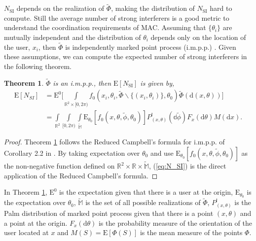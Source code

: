 \documentclass[10pt, conference, letterpaper]{IEEEtran}
\newtheorem{theorem}{Theorem}
\begin{document}
$N_{\mathrm{SI}}$ depends on the realization of $\tilde{\Phi}$, making the distribution of $N_{\mathrm{SI}}$ hard to compute. Still the average number of strong interferers is a good metric to understand the coordination requirements of MAC. Assuming that $\{\theta_i\}$ are mutually independent and the distribution of $\theta_i$ depends only on the location of the user, $x_i$, then $\tilde{\Phi}$ is independently marked point process (i.m.p.p.) \cite{stochasticgeometry}. Given these assumptions, we can compute the expected number of strong interferers in the following theorem.
\begin{theorem}\label{theorem:E_N_SI}
	$\tilde{\Phi}$ is an i.m.p.p., then $\mathrm{E}[N_{\mathrm{SI}}]$ is given by,
	\begin{equation} \label{eq:N_SI}
	\begin{split}
	\mathrm{E}[N_{SI}] &= \mathrm{E}^0\bigg[\int\limits_{\mathbb{R}^2\times[0,2\pi)}f_0(x_i, \theta_i, \tilde{\Phi}\backslash\{(x_i,\theta_i)\}, \theta_0)\tilde{\Phi}(\mathrm{d}(x,\theta)) \bigg]\\
	&= \int\limits_{\mathbb{R}^2}\int\limits_{[0,2\pi)}\int\limits_{\mathbb{\tilde{M}}}\mathrm{E}_{\theta_0}[f_0(x,\theta,\tilde{\phi}, \theta_0)]P_{(x,\theta)}^{!}(\mathbb{d}\tilde{\phi})F_x(\mathrm{d}\theta)M(\mathrm{d}x).
	\end{split}
	\end{equation}	
\end{theorem}
\begin{proof}
	Theorem \ref{theorem:E_N_SI} follows the Reduced Campbell's formula for i.m.p.p. of Corollary 2.2 in \cite{stochasticgeometry}. By taking expectation over $\theta_0$ and use $\mathrm{E}_{\theta_0}[f_0(x,\theta,\tilde{\phi}, \theta_0)]$ as the non-negative function defined on $\mathbb{R}^2\times \mathbb{R}\times \mathbb{\tilde{M}}$, (\ref{eq:N_SI}) is the direct application of the Reduced Campbell's formula.
\end{proof}

In Theorem \ref{theorem:E_N_SI}, $\mathrm{E}^0$ is the expectation given that there is a user at the origin, $\mathrm{E}_{\theta_0}$ is the expectation over $\theta_0$, $\mathbb{\tilde{M}}$ is the set of all possible realizations of $\tilde{\Phi}$, $P_{(x,\theta)}^!$ is the Palm distribution of marked point process given that there is a point $(x, \theta)$ and a point at the origin. $F_x(\mathrm{d}\theta)$ is the probability measure of the orientation of the user located at $x$ and $M(S)=\mathrm{E}[\Phi(S)]$ is the mean measure of the points $\Phi$.
\end{document}
